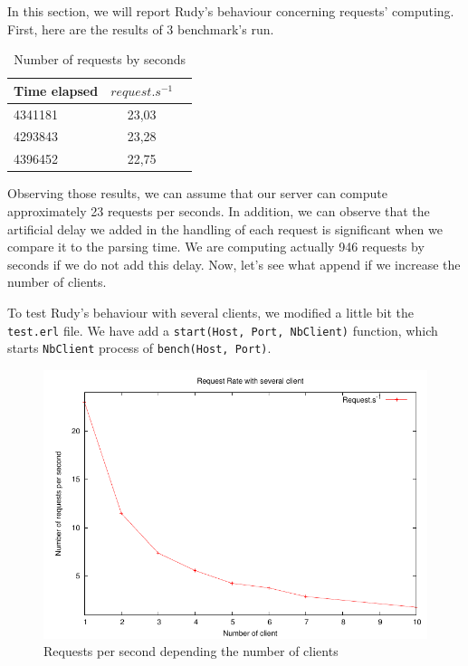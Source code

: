 \documentclass[a4paper, 11pt]{article}
\begin{document}
In this section, we will report Rudy's behaviour concerning requests' computing. First, here are the results of 3 benchmark's run.

\begin{table}[h]
\centering
\begin{tabular}{lcc}
Time elapsed & $request.s^{-1}$\\\hline
4341181 & 23,03\\\hline
4293843& 23,28\\\hline
4396452& 22,75\\\hline
\end{tabular}
\caption{Number of requests by seconds}
\label{tab:results}
\end{table}

Observing those results, we can assume that our server can compute approximately 23 requests per seconds. In addition, we can observe that the artificial delay we added in the handling of each request is significant when we compare it to the parsing time. We are computing actually 946 requests by seconds if we do not add this delay.
Now, let's see what append if we increase the number of clients. 

To test Rudy's behaviour with several clients, we modified a little bit the \lstinline!test.erl! file. We have add a \lstinline!start(Host, Port, NbClient)! function, which starts \lstinline!NbClient! process of \lstinline!bench(Host, Port)!.\\


\begin{figure}
  \begin{center}
    \includegraphics{concurency}
    \caption{Requests per second depending the number of clients}
    \label{fig:Concurrency}
  \end{center}
\end{figure}
\end{document}
